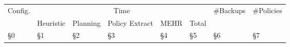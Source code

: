 \begin{tabular}{|l|lllll|c|c|}
\hline
\multirow{2}{*}{Config.} &
  \multicolumn{5}{c|}{Time} &
  \multirow{2}{*}{#Backups} &
  \multirow{2}{*}{#Policies} \\ \cline{2-6}
 &
  \multicolumn{1}{l|}{Heuristic} &
  \multicolumn{1}{l|}{Planning} &
  \multicolumn{1}{l|}{Policy Extract} &
  \multicolumn{1}{l|}{MEHR} &
  Total &
   &
   \\ \hline
§0 &
  \multicolumn{1}{l|}{§1} &
  \multicolumn{1}{l|}{§2} &
  \multicolumn{1}{l|}{§3} &
  \multicolumn{1}{l|}{§4} &
  §5 &
  \multicolumn{1}{l|}{§6} &
  \multicolumn{1}{l|}{§7} \\ \hline
\end{tabular}